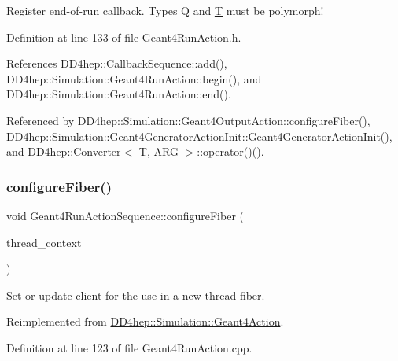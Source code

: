 Register end-\/of-\/run callback. Types Q and \hyperlink{class_t}{T} must be polymorph! 



Definition at line 133 of file Geant4\+Run\+Action.\+h.



References D\+D4hep\+::\+Callback\+Sequence\+::add(), D\+D4hep\+::\+Simulation\+::\+Geant4\+Run\+Action\+::begin(), and D\+D4hep\+::\+Simulation\+::\+Geant4\+Run\+Action\+::end().



Referenced by D\+D4hep\+::\+Simulation\+::\+Geant4\+Output\+Action\+::configure\+Fiber(), D\+D4hep\+::\+Simulation\+::\+Geant4\+Generator\+Action\+Init\+::\+Geant4\+Generator\+Action\+Init(), and D\+D4hep\+::\+Converter$<$ T, A\+R\+G $>$\+::operator()().

\hypertarget{class_d_d4hep_1_1_simulation_1_1_geant4_run_action_sequence_adf657c521620857ffed702783c0a2712}{}\label{class_d_d4hep_1_1_simulation_1_1_geant4_run_action_sequence_adf657c521620857ffed702783c0a2712} 
\subsubsection{\texorpdfstring{configure\+Fiber()}{configureFiber()}}
{\footnotesize\ttfamily void Geant4\+Run\+Action\+Sequence\+::configure\+Fiber (\begin{DoxyParamCaption}\item[{\hyperlink{class_d_d4hep_1_1_simulation_1_1_geant4_context}{Geant4\+Context} $\ast$}]{thread\+\_\+context }\end{DoxyParamCaption})\hspace{0.3cm}{\ttfamily [virtual]}}



Set or update client for the use in a new thread fiber. 



Reimplemented from \hyperlink{class_d_d4hep_1_1_simulation_1_1_geant4_action_a6adc7138508303e4e417cb48a737ab19}{D\+D4hep\+::\+Simulation\+::\+Geant4\+Action}.



Definition at line 123 of file Geant4\+Run\+Action.\+cpp.



